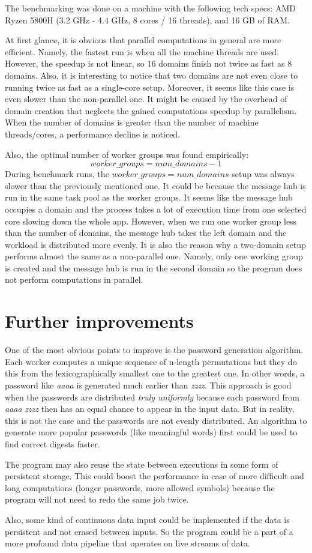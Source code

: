 \documentclass{article}
\begin{document}
The benchmarking was done on a machine with the following tech specs: AMD Ryzen 5800H (3.2 GHz - 4.4 GHz, 8 cores / 16 threads), and 16 GB of RAM. 

At first glance, it is obvious that parallel computations in general are more efficient. Namely, the fastest run is when all the machine threads are used. However, the speedup is not linear, so 16 domains finish not twice as fast as 8 domains. Also, it is interesting to notice that two domains are not even close to running twice as fast as a single-core setup. Moreover, it seems like this case is even slower than the non-parallel one. It might be caused by the overhead of domain creation that neglects the gained computations speedup by parallelism. When the number of domains is greater than the number of machine threads/cores, a performance decline is noticed.

Also, the optimal number of worker groups was found empirically: 
$$ worker\_groups = num\_domains - 1 $$
During benchmark runs, the $ worker\_groups = num\_domains $ setup was always slower than the previously mentioned one. It could be because the message hub is run in the same task pool as the worker groups. It seems like the message hub occupies a domain and the process takes a lot of execution time from one selected core slowing down the whole app. However, when we run one worker group less than the number of domains, the message hub takes the left domain and the workload is distributed more evenly. It is also the reason why a two-domain setup performs almost the same as a non-parallel one. Namely, only one working group is created and the message hub is run in the second domain so the program does not perform computations in parallel.

\section{Further improvements}

One of the most obvious points to improve is the password generation algorithm. Each worker computes a unique sequence of n-length permutations but they do this from the lexicographically smallest one to the greatest one. In other words, a password like \emph{aaaa} is generated much earlier than \emph{zzzz}. This approach is good when the passwords are distributed \emph{truly uniformly} because each password from \emph{aaaa} \emph{zzzz} then has an equal chance to appear in the input data. But in reality, this is not the case and the passwords are not evenly distributed. An algorithm to generate more popular passwords (like meaningful words) first could be used to find correct digests faster.

The program may also reuse the state between executions in some form of persistent storage. This could boost the performance in case of more difficult and long computations (longer passwords, more allowed symbols) because the program will not need to redo the same job twice.

Also, some kind of continuous data input could be implemented if the data is persistent and not erased between inputs. So the program could be a part of a more profound data pipeline that operates on live streams of data.
\end{document}
